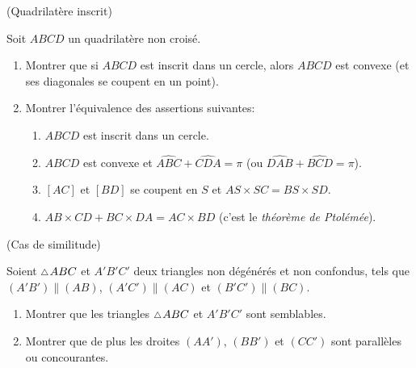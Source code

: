 \documentclass[a4paper,11pt,reqno]{amsart}
\begin{document}
\begin{exo} (Quadrilatère inscrit)

    Soit $ABCD$ un quadrilatère non croisé.
    \begin{enumerate}
      \item Montrer que si $ABCD$ est inscrit dans un cercle, alors $ABCD$ est convexe (et ses diagonales se coupent en un point).
      \item Montrer l'équivalence des assertions suivantes:
      \begin{enumerate}
        \item $ABCD$ est inscrit dans un cercle.
        \item $ABCD$ est convexe et $\widehat{ABC}+\widehat{CDA} = \pi$ (ou $\widehat{DAB}+\widehat{BCD} = \pi$).
        \item $[AC]$ et $[BD]$ se coupent en $S$ et $AS \times SC = BS \times SD$.
        \item $AB\times CD + BC\times DA = AC\times BD$ (c'est le \emph{théorème de Ptolémée}).
      \end{enumerate}
    \end{enumerate}
\end{exo}

\begin{exo} (Cas de similitude)

  Soient $\tri ABC$ et $A'B'C'$ deux triangles non dégénérés et non confondus, tels que $(A'B') \parallel (AB)$, $(A'C') \parallel (AC)$ et $(B'C') \parallel (BC)$.
  \begin{enumerate}
    \item Montrer que les triangles $\tri ABC$ et $A'B'C'$ sont semblables.
    \item Montrer que de plus les droites $(AA')$, $(BB')$ et $(CC')$ sont parallèles ou concourantes.
  \end{enumerate}

\end{exo}
\end{document}
